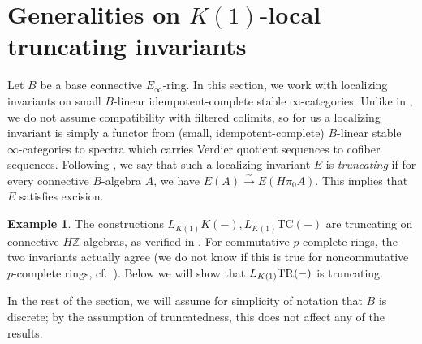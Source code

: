 \documentclass{amsart}
\theoremstyle{definition}
\newtheorem{example}[theorem]{Example}
\newcommand{\TC}{\mathrm{TC}}
\begin{document}
\section{Generalities on $K(1)$-local truncating invariants}
\label{generalK1loctrunc}

Let $B$ be a base connective $E_\infty$-ring. 
In this section, we work with localizing invariants on small $B$-linear
idempotent-complete stable $\infty$-categories. Unlike in \cite{BGT13}, we do
not assume compatibility with filtered
colimits, so for us a localizing
invariant is simply a functor from (small, idempotent-complete) $B$-linear
stable $\infty$-categories to spectra which carries Verdier quotient sequences
to cofiber sequences. 
Following \cite{LT19}, we say that  such a localizing invariant $E$ is
\emph{truncating} if for every connective $B$-algebra $A$, we have 
$E(A) \xrightarrow{\sim} E(H \pi_0 A)$. 
This implies \cite[Th.~B]{LT19} that $E$ satisfies excision. 

\begin{example} 
The constructions $L_{K(1)} K(-), L_{K(1)} \TC(-)$ are truncating on connective
$H\mathbb{Z}$-algebras, as verified in \cite{LMT}. 
For commutative $p$-complete rings, the two invariants actually agree  (we do not know if
this is true for noncommutative $p$-complete rings, cf.~\cite[Question 2.20]{BCM}). 
Below we will show that $L_{K(1)}
\mathrm{TR}(-)$ is truncating. 
\end{example} 


In the rest of the section, we will assume for simplicity of notation that $B$
is discrete; by the assumption of truncatedness, this does not affect any of the
results. 
\end{document}
